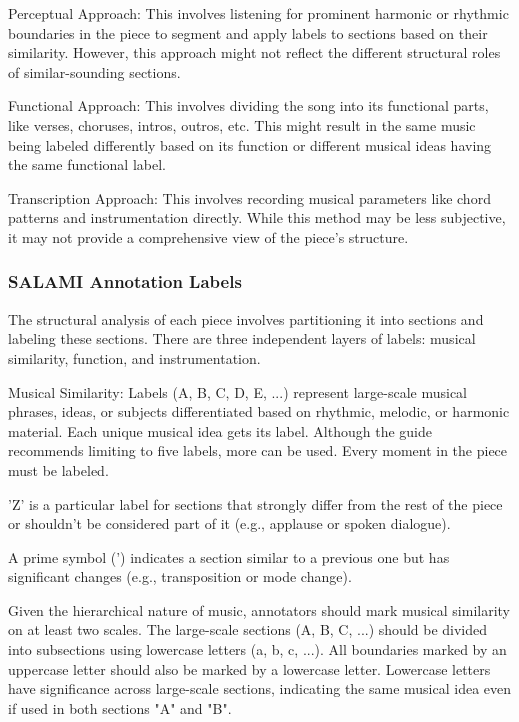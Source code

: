 Perceptual Approach: This involves listening for prominent harmonic or rhythmic boundaries in the piece to segment and apply labels to sections based on their similarity. However, this approach might not reflect the different structural roles of similar-sounding sections.

Functional Approach: This involves dividing the song into its functional parts, like verses, choruses, intros, outros, etc. This might result in the same music being labeled differently based on its function or different musical ideas having the same functional label.

Transcription Approach: This involves recording musical parameters like chord patterns and instrumentation directly. While this method may be less subjective, it may not provide a comprehensive view of the piece's structure.


\subsubsection{SALAMI Annotation Labels}

The structural analysis of each piece involves partitioning it into sections and labeling these sections. There are three independent layers of labels: musical similarity, function, and instrumentation.

Musical Similarity: Labels (A, B, C, D, E, ...) represent large-scale musical phrases, ideas, or subjects differentiated based on rhythmic, melodic, or harmonic material. Each unique musical idea gets its label. Although the guide recommends limiting to five labels, more can be used. Every moment in the piece must be labeled.

'Z' is a particular label for sections that strongly differ from the rest of the piece or shouldn't be considered part of it (e.g., applause or spoken dialogue).

A prime symbol (') indicates a section similar to a previous one but has significant changes (e.g., transposition or mode change).

Given the hierarchical nature of music, annotators should mark musical similarity on at least two scales. The large-scale sections (A, B, C, ...) should be divided into subsections using lowercase letters (a, b, c, ...). All boundaries marked by an uppercase letter should also be marked by a lowercase letter. Lowercase letters have significance across large-scale sections, indicating the same musical idea even if used in both sections "A" and "B".

